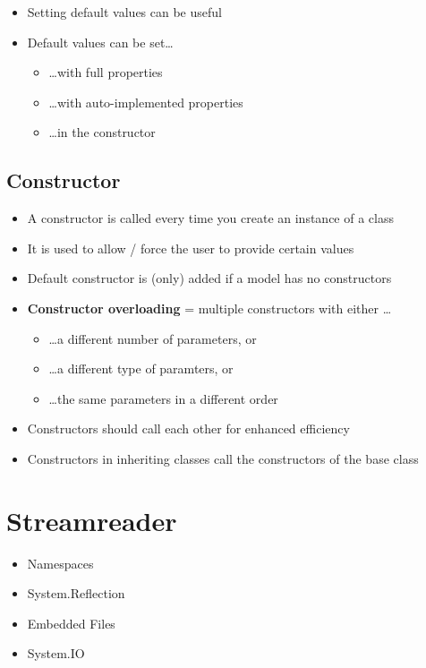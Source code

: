 \documentclass{article}
\newcommand{\bold}[1]{\textbf{#1}}
\begin{document}
\begin{itemize}
    \item Setting default values can be useful
    \item Default values can be set\dots
    \begin{itemize}
        \item \dots with full properties
        \item \dots with auto-implemented properties
        \item \dots in the constructor
    \end{itemize}
\end{itemize}

\subsection{Constructor}

\begin{itemize}
    \item A constructor is called every time you create an instance of a class
    \item It is used to allow / force the user to provide certain values
    \item Default constructor is (only) added if a model has no constructors
    \item \bold{Constructor overloading} = multiple constructors with either \dots
    \begin{itemize}
        \item \dots a different number of parameters, or
        \item \dots a different type of paramters, or
        \item \dots the same parameters in a different order
    \end{itemize}
    \item Constructors should call each other for enhanced efficiency
    \item Constructors in inheriting classes call the constructors of the base class
\end{itemize}


\section{Streamreader}

\begin{itemize}
    \item Namespaces
    \item System.Reflection
    \item Embedded Files
    \item System.IO
\end{itemize}
\end{document}
